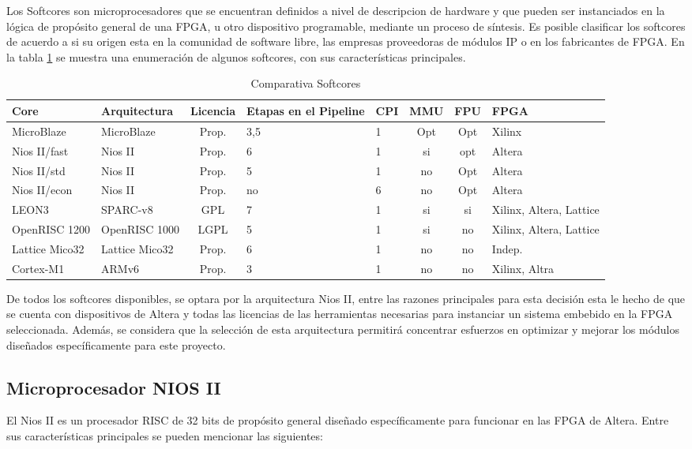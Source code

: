 Los Softcores son microprocesadores que se encuentran definidos a nivel de descripcion de hardware y que pueden ser instanciados en la lógica de propósito general de una FPGA, u otro dispositivo programable, mediante un proceso de síntesis. Es posible clasificar los softcores de acuerdo a si su origen esta en la comunidad de software libre, las empresas proveedoras de módulos IP o en los fabricantes de FPGA.  En la tabla \ref{tab:comp} se muestra una enumeración de algunos softcores, con sus características principales. 

\begin{table}[h]
	 \begin{tabular}{|p{1.65cm}|p{1.98cm}|c|p{1.4cm}|p{0.6cm}|c|c|p{1.3cm}|} \hline
		Core & Arquitectura & Licencia & Etapas en el Pipeline & CPI & MMU & FPU & FPGA \\ \hline
		MicroBlaze & MicroBlaze & Prop. & 3,5 & 1 & Opt & Opt & Xilinx\\ \hline
		Nios II/fast & Nios II & Prop. & 6 & 1 & si & opt & Altera \\ \hline
		Nios II/std & Nios II & Prop. & 5 & 1 & no & Opt & Altera \\ \hline
		Nios II/econ & Nios II & Prop. & no & 6 & no & Opt & Altera \\ \hline
		LEON3 & SPARC-v8 & GPL & 7 & 1 & si & si & Xilinx, Altera, Lattice \\ \hline
		OpenRISC 1200 & OpenRISC 1000 & LGPL & 5 & 1 & si & no & Xilinx, Altera, Lattice \\ \hline
		Lattice Mico32 & Lattice Mico32 & Prop. & 6 & 1 & no & no & Indep. \\ \hline
		Cortex-M1 & ARMv6 & Prop. & 3 & 1 & no & no & Xilinx, Altra \\ \hline
	\end{tabular}
		\caption{Comparativa Softcores}
	\label{tab:comp}
\end{table}

De todos los softcores disponibles, se optara por la arquitectura Nios II, entre las razones principales para esta decisión esta le hecho de que se cuenta con dispositivos de Altera y todas las licencias de las herramientas necesarias para instanciar un sistema embebido en la FPGA seleccionada. Además, se considera que la selección de esta arquitectura permitirá concentrar esfuerzos en optimizar y mejorar los módulos diseñados específicamente para este proyecto.\newpage
\subsection{Microprocesador NIOS II}
El Nios II es un procesador RISC de 32 bits de propósito general diseñado específicamente para funcionar en las FPGA de Altera. Entre sus características principales se pueden mencionar las siguientes:

